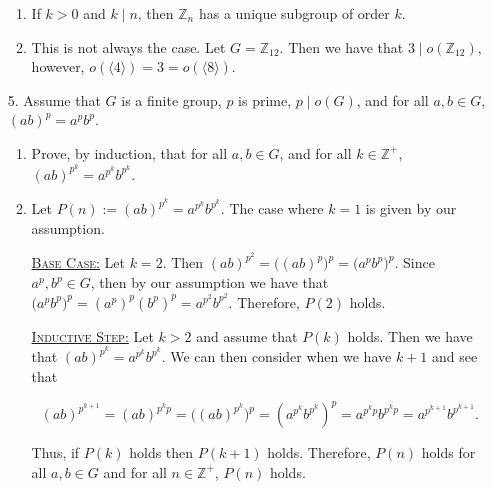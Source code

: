 \documentclass[12pt]{article}
\makeatletter
\theoremstyle{definition}
\theoremstyle{remark}
\renewenvironment{proof}[1][\proofname]{\par
  \pushQED{\qed}%
  \normalfont \topsep6\p@\@plus6\p@\relax
  \list{}{\leftmargin=0mm
          \rightmargin=4mm
          \settowidth{\itemindent}{\itshape#1}%
          \labelwidth=\itemindent
          \parsep=0pt \listparindent=\parindent 
  }
  \item[\hskip\labelsep
        \itshape
    #1\@addpunct{.}]\ignorespaces
}{%
  \popQED\endlist\@endpefalse
}
\let\oldproofname=\proofname
\renewcommand{\proofname}{\bf{\textit{\oldproofname}}}
\makeatother
\begin{document}
\begin{enumerate}[leftmargin=*]
\begin{enumerate}[label=(\alph*)]
                    \item If $k>0$ and $k\mid n$, then $\mathbb{Z}_n$ has a unique subgroup of order $k$.
                        \begin{proof}
                            This is not always the case. Let $G=\mathbb{Z}_{12}$. Then we have that $3\mid o(\mathbb{Z}_{12})$, however, $o(\langle 4\rangle)=3=o(\langle 8\rangle)$.
                        \end{proof}
                \end{enumerate}
                
            \item[5.] Assume that $G$ is a finite group, $p$ is prime, $p\mid o(G)$, and for all $a,b\in G$, $(ab)^p=a^pb^p$. 
                \begin{enumerate}[label=(\alph*)]
                    \item Prove, by induction, that for all $a,b\in G$, and for all $k\in\mathbb{Z}^{+}$, $(ab)^{p^k}=a^{p^k}b^{p^k}$.
                        \begin{proof}
                            Let $P(n):=(ab)^{p^k}=a^{p^k}b^{p^k}$. The case where $k=1$ is given by our assumption.\par\vspace{2mm}\underline{\textsc{Base Case:}} Let $k=2$. Then $(ab)^{p^2}=\big((ab)^p\big)^p=\big(a^pb^p)^p$. Since $a^p,b^p\in G$, then by our assumption we have that $\big(a^pb^p\big)^p=(a^p)^p(b^p)^p=a^{p^2}b^{p^2}$. Therefore, $P(2)$ holds.
                            
                            \par\vspace{2mm}\underline{\textsc{Inductive Step:}} Let $k>2$ and assume that $P(k)$ holds. Then we have that $(ab)^{p^k}=a^{p^k}b^{p^k}$. We can then consider when we have $k+1$ and see that 
                            
                            \begin{equation*}
                                (ab)^{p^{k+1}}=(ab)^{p^kp}=\big((ab)^{p^k}\big)^p=(a^{p^k}b^{p^k})^p=a^{p^kp}b^{p^kp}=a^{p^{k+1}}b^{p^{k+1}}.
                            \end{equation*}
                            
                            Thus, if $P(k)$ holds then $P(k+1)$ holds. Therefore, $P(n)$ holds for all $a,b\in G$ and for all $n\in\mathbb{Z}^{+}$, $P(n)$ holds.
                        \end{proof}
                        

\end{enumerate}
\end{enumerate}
\end{document}
